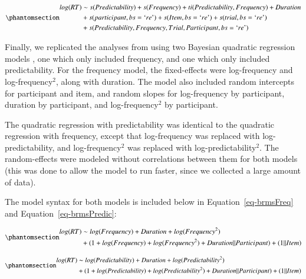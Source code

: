 \documentclass[
  authoryear,
  preprint,
  1p,
  onecolumn]{elsarticle}
\begin{document}
\begin{equation}\phantomsection\label{eq-gammFull}{
\begin{aligned}log(RT) & \sim s(Predictability) + s(Frequency) + ti (Predictability, Frequency) + Duration \\ & + s(participant, bs = \text{`}re\text{'}) + s(Item, bs = \text{`}re\text{'})  + s(trial, bs = \text{`}re\text{'}) \\ & + s(Predictability, Frequency, Trial, Participant, bs = \text{`}re\text{'}) \end{aligned}
}\end{equation}

Finally, we replicated the analyses from \citet{kapatsinski2009} using
two Bayesian quadratic regression models \citep[implemented in
\emph{brms;}][]{brms}, one which only included frequency, and one which
only included predictability. For the frequency model, the fixed-effects
were log-frequency and log-frequency\(^2\), along with duration. The
model also included random intercepts for participant and item, and
random slopes for log-frequency by participant, duration by participant,
and log-frequency\(^2\) by participant.

The quadratic regression with predictability was identical to the
quadratic regression with frequency, except that log-frequency was
replaced with log-predictability, and log-frequency\(^2\) was replaced
with log-predictability\(^2\). The random-effects were modeled without
correlations between them for both models (this was done to allow the
model to run faster, since we collected a large amount of data).

The model syntax for both models is included below in
Equation~\ref{eq-brmsFreq} and Equation~\ref{eq-brmsPredic}:

\begin{equation}\phantomsection\label{eq-brmsFreq}{
\begin{aligned}
log(RT) & \sim log(Frequency) + Duration + log(Frequency^2) \\ & + (1 + log(Frequency) + log(Frequency^2) + Duration || Participant) + (1 || Item)
\end{aligned}
}\end{equation}

\begin{equation}\phantomsection\label{eq-brmsPredic}{
\begin{aligned}
log(RT) & \sim log(Predictability) + Duration + log(Predictability^2) \\ & + (1 + log(Predictability) + log(Predictability^2) + Duration || Participant) + (1 || Item)
\end{aligned}
}\end{equation}
\end{document}
